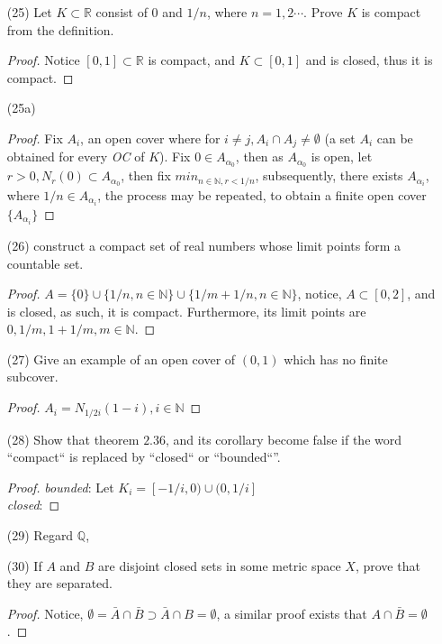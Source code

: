 \documentclass{amsart}
\numberwithin{equation}{section}
\theoremstyle{plain}
\theoremstyle{definition}
\begin{document}
\begin{enumerate}
\begin{proof}
  \end{proof} 
  \item[(25)] Let $K \subset \mathbb{R}$ consist of $0$ and $1/n$, where $n = 1,2 \cdots$. Prove $K$ is compact from the definition.
  \begin{proof}
    Notice $[0, 1] \subset \mathbb{R}$ is compact, and $K \subset [0,1]$ and is closed, thus it is compact.
  \end{proof}
  \item[(25a)]
  \begin{proof}
    Fix $A_i$, an open cover where for $i \not= j, A_i \cap A_j \not= \emptyset$ (a set $A_i$ can be obtained for every \textit{OC} of $K$).
    Fix $0 \in A_{\alpha_0}$, then as $A_{\alpha_0}$ is open, let $r > 0, N_r(0) \subset A_{{\alpha}_0}$, then fix $min_{n \in \mathbb{N}, r < 1/n}$, 
    subsequently, there exists $A_{\alpha_i}$, where $1/n \in A_{\alpha_i}$, the process may be repeated, to obtain a finite open cover
    $\{A_{\alpha_i}\}$
  \end{proof}
  \item[(26)] construct a compact set of real numbers whose limit points form a countable set.
  \begin{proof}
    $A = \{0\} \cup \{1/n, n \in \mathbb{N}\} \cup \{1/m + 1/n, n \in \mathbb{N}\}$, notice, $A \subset [0,2]$, and is closed,
    as such, it is compact. Furthermore, its limit points are $0, 1/m,1 + 1/m,  m \in \mathbb{N}$.
  \end{proof}
  \item[(27)] Give an example of an open cover of $(0,1)$ which has no finite subcover.
  \begin{proof}
    $A_i = N_{1/2i}(1-i), i \in \mathbb{N}$
  \end{proof}
  \item[(28)] Show that theorem $2.36$, and its corollary become false if the word ``compact`` is replaced by ``closed``  or ``bounded``''.
  \begin{proof}
    \textit{bounded}: Let $K_i = [-1/i, 0) \cup (0, 1/i]$ \\
    \textit{closed}: 
  \end{proof}
  \item[(29)] Regard $\mathbb{Q}$,
  \item[(30)] If $A$ and $B$ are disjoint closed sets in some metric space $X$, prove that they are separated.
  \begin{proof}
    Notice, $\emptyset = \bar{A} \cap \bar{B} \supset \bar{A} \cap B = \emptyset$, a similar proof exists that $A \cap \bar{B} = \emptyset$.

\end{proof}
\end{enumerate}
\end{document}

